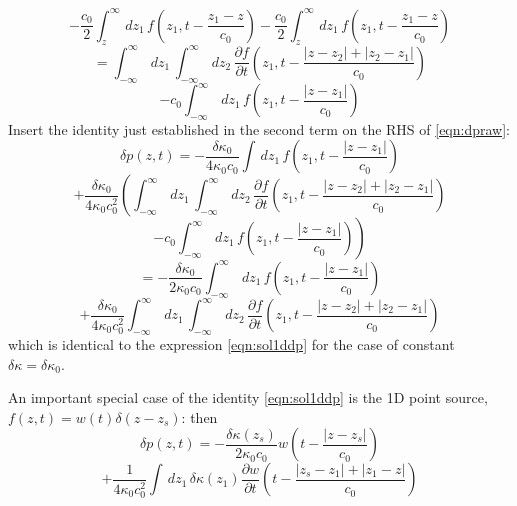  \[
   - \frac{c_0}{2}\int^{\infty}_z \,dz_1\,f\left(z_1,t-\frac{z_1-z}{c_0}\right)
   -\frac{c_0}{2} \int^{\infty}_z \,dz_1\,f\left(z_1,t-\frac{z_1-z}{c_0}\right)
 \]
 \[
   =\int_{-\infty}^{\infty} \,dz_1\,\int_{-\infty}^{\infty} \,dz_2\, \frac{\partial f}{\partial
     t}\left(z_1,t-\frac{|z-z_2|+|z_2-z_1|}{c_0}\right)
 \]
 \[
   -c_0\int_{-\infty}^{\infty} \,dz_1\, f\left(z_1,t-\frac{|z-z_1|}{c_0}\right)
 \]
 Insert the identity just established in the second term on the RHS of
 \ref{eqn:dpraw}:
 \[
  \delta p(z,t) = -\frac{\delta \kappa_0}{4 \kappa_0 c_0} \int
  \,dz_1\,f\left(z_1,t-\frac{|z-z_1|}{c_0}\right)
\]
\[
  +\frac{\delta \kappa_0}{4\kappa_0c_0^2}\left(\int_{-\infty}^{\infty} \,dz_1\,\int_{-\infty}^{\infty} \,dz_2\, \frac{\partial f}{\partial
      t}\left(z_1,t-\frac{|z-z_2|+|z_2-z_1|}{c_0}\right) \right.
\]
\[
  \left. -c_0\int_{-\infty}^{\infty} \,dz_1\,
    f\left(z_1,t-\frac{|z-z_1|}{c_0}\right)\right)
\]
\[
=-\frac{\delta \kappa_0}{2\kappa_0c_0}\int_{-\infty}^{\infty} \,dz_1\,
f\left(z_1,t-\frac{|z-z_1|}{c_0}\right)
\]
\begin{equation}
  \label{eqn:dpraw}
+  \frac{\delta \kappa_0}{4\kappa_0c_0^2}\int_{-\infty}^{\infty} \,dz_1\,\int_{-\infty}^{\infty} \,dz_2\, \frac{\partial f}{\partial
      t}\left(z_1,t-\frac{|z-z_2|+|z_2-z_1|}{c_0}\right)
  \end{equation}
which is identical to the expression \ref{eqn:sol1ddp} for the case of constant
$\delta \kappa = \delta \kappa_0$.

An important special case of the identity \ref{eqn:sol1ddp} is the 1D point source,
$f(z,t)=w(t)\delta(z-z_s)$: then
\[
  \delta p(z,t) = -\frac{\delta \kappa(z_s)}{2\kappa_0c_0}w\left(t - \frac{|z-z_s|}{c_0}\right)
\]
\begin{equation}
  \label{eqn:sol1ddppw}
  +\frac{1}{4\kappa_0c_0^2} \int \,dz_1\,\delta 
  \kappa(z_1) \frac{\partial w}{\partial t}\left(t - \frac{|z_s-z_1|+|z_1-z|}{c_0}\right)
\end{equation}


